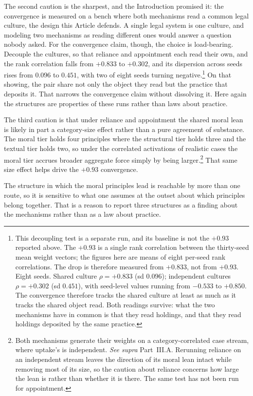 The second caution is the sharpest, and the Introduction promised it: the
convergence is measured on a bench where both mechanisms read a common
legal culture, the design this Article defends. A single legal
system is one culture, and modeling two mechanisms as reading different
ones would answer a question nobody asked. For the convergence claim, though, the choice is load-bearing.
Decouple the cultures, so that reliance and appointment each read their
own, and the rank correlation falls from $+0.833$ to $+0.302$, and its
dispersion across seeds rises from $0.096$ to $0.451$, with two of eight
seeds turning negative.\footnote{This decoupling test is a separate run, and its baseline is not the $+0.93$
reported above. The $+0.93$ is a single rank correlation between the
thirty-seed mean weight vectors; the figures here are means of eight per-seed
rank correlations. The drop is therefore measured from $+0.833$, not from
$+0.93$. Eight seeds. Shared culture $\rho = +0.833$ (sd $0.096$); independent
cultures $\rho = +0.302$ (sd $0.451$), with seed-level values running from
$-0.533$ to $+0.850$. The convergence
therefore tracks the shared culture at least as much as it tracks the
shared object read. Both readings survive: what the two mechanisms have in
common is that they read holdings, and that they read holdings deposited by
the same practice.} On that showing, the pair share not only the object they read but
the practice that deposits it. That narrows the convergence claim
without dissolving it. Here again the structures
are properties of these runs rather than laws about practice.

The third caution is that under reliance and appointment the shared moral
lean is likely in part a category-size effect rather than a pure agreement
of substance. The moral
tier holds four principles where the structural tier holds three and the
textual tier holds two, so under the correlated activations of realistic
cases the moral tier accrues broader aggregate force simply by being
larger.\footnote{Both mechanisms generate their weights on a category-correlated case stream,
where uptake's is independent. \textit{See supra} Part~III.A. Rerunning
reliance on an independent stream leaves the direction of its moral lean
intact while removing most of its size, so the caution about reliance concerns
how large the lean is rather than whether it is there. The same test has not
been run for appointment.} That same size effect helps drive the $+0.93$ convergence.

The structure in which the moral principles lead is reachable by more than one
route, so it is sensitive
to what one assumes at the outset about which principles belong together. That is a
reason to report three structures as a finding about the mechanisms rather
than as a law about practice.

